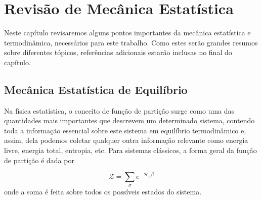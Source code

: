 \chapter{Revisão de Mecânica Estatística}

Neste capítulo revisaremos alguns pontos importantes da mecânica estatística e termodinâmica, necessários para este trabalho. Como estes serão grandes resumos sobre diferentes tópicos, referências adicionais estarão inclusas no final do capítulo.

\section{Mecânica Estatística de Equilíbrio}

Na física estatística, o conceito de função de partição surge como uma das quantidades mais importantes que descrevem um determinado sistema, contendo toda a informação essencial sobre este sistema em equilíbrio termodinâmico e, assim, dela podemos coletar qualquer outra informação relevante como energia livre, energia total, entropia, etc. Para sistemas clássicos, a forma geral da função de partição é dada por

\begin{equation}
{\displaystyle \mathcal{Z} = \sum_{\sigma} e^{- \mathcal{H}_{\sigma} \beta}}
\end{equation}
onde a soma é feita sobre todos os possíveis estados do sistema.
